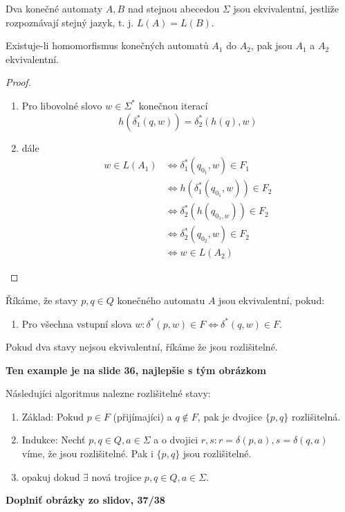 \documentclass[../main.tex]{subfiles}
\begin{document}
\begin{definition}

    Dva konečné automaty $A,B$ nad stejnou abecedou $\Sigma$ jsou ekvivalentní, jestliže
    rozpoznávají stejný jazyk, t. j. $L(A) = L(B)$.
\end{definition}

\begin{theorem}
    Existuje-li homomorfismus konečných automatů $A_1$ do $A_2$, pak jsou $A_1$ a $A_2$
    ekvivalentní.
\end{theorem}
\begin{proof}
    \begin{enumerate}
        \item Pro libovolné slovo $w\in \Sigma^*$ konečnou iterací
        \[h(\delta^*_1(q,w)) = \delta^*_2(h(q),w)\]
        \item dále
        \begin{align*}
            w\in L(A_1) &\Leftrightarrow \delta^*_1(q_{0_1},w)\in F_1\\
            &\Leftrightarrow h(\delta^*_1(q_{0_1},w)) \in F_2\\
            &\Leftrightarrow \delta^*_2(h(q_{0_1,w}))\in F_2\\
            &\Leftrightarrow \delta^*_2(q_{0_2},w)\in F_2\\
            &\Leftrightarrow w\in L(A_2)
        \end{align*}
    \end{enumerate}
\end{proof}

\begin{definition}
    Říkáme, že stavy $p,q \in Q$ konečného automatu $A$ jsou ekvivalentní, pokud:
    \begin{enumerate}
        \item Pro všechna vstupní slova $w: \delta^*(p,w) \in F \Leftrightarrow \delta^*(q,w)\in F$.
    \end{enumerate}
    Pokud dva stavy nejsou ekvivalentní, říkáme že jsou rozlišitelné.
\end{definition}
\begin{example}
        \textbf{Ten example je na slide 36, najlepšie s tým obrázkom}
\end{example}

\begin{definition}
    Následujíci algoritmus nalezne rozlišitelné stavy:
    \begin{enumerate}
        \item Základ: Pokud $p\in F$ (přijímajíci) a $q \notin F$, pak je dvojice $\{p,q\}$ rozlišitelná.
        \item Indukce: Nechť $p,q\in Q, a \in \Sigma$ a o dvojici $r,s : r = \delta(p,a), s= \delta(q,a)$ víme,
        že jsou rozlišitelné. Pak i $\{p,q\}$ jsou rozlišitelné.
        \item opakuj dokud $\exists$ nová trojice $p,q\in Q, a\in \Sigma$.
    \end{enumerate}
    \textbf{Doplniť obrázky zo slidov, 37/38}
\end{definition}
\end{document}

